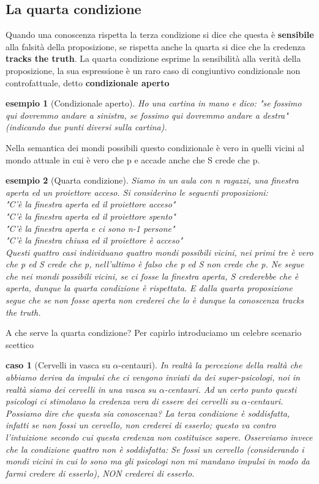 \documentclass[10pt,a4paper]{article}
\newtheorem{esempio}{esempio}
\newtheorem{caso}{caso}
\begin{document}
\subsection{La quarta condizione}
Quando una conoscenza rispetta la terza condizione si dice che questa è \textbf{sensibile} alla falsità della proposizione, se rispetta anche la quarta si dice che la credenza \textbf{tracks the truth}. La quarta condizione esprime la sensibilità alla verità della proposizione, la sua espressione è un raro caso di congiuntivo condizionale non controfattuale, detto \textbf{condizionale aperto}
\begin{esempio}[Condizionale aperto]
	Ho una cartina in mano e dico: "se fossimo qui dovremmo andare a sinistra, se fossimo qui dovremmo andare a destra" (indicando due punti diversi sulla cartina). 
\end{esempio}
Nella semantica dei mondi possibili questo condizionale è vero in quelli vicini al mondo attuale in cui è vero che p e accade anche che S crede che p. 
\begin{esempio}[Quarta condizione]
	Siamo in un aula con n ragazzi, una finestra aperta ed un proiettore acceso. Si considerino le seguenti proposizioni:\\
	"C'è la finestra aperta ed il proiettore acceso"\\
	"C'è la finestra aperta ed il proiettore spento"\\
	"C'è la finestra aperta e ci sono n-1 persone"\\
	"C'è la finestra chiusa ed il proiettore è acceso"\\
	Questi quattro casi individuano quattro mondi possibili vicini, nei primi tre è vero che p ed S crede che p, nell'ultimo è falso che p ed S non crede che p. Ne segue che nei mondi possibili vicini, se ci fosse la finestra aperta, S crederebbe che è aperta, dunque la quarta condizione è rispettata. E dalla quarta proposizione segue che se non fosse aperta non crederei che lo è dunque la conoscenza tracks the truth. 
\end{esempio}
A che serve la quarta condizione? Per capirlo introduciamo un celebre scenario scettico
\begin{caso}[Cervelli in vasca su $\alpha$-centauri]
	In realtà la percezione della realtà che abbiamo deriva da impulsi che ci vengono inviati da dei super-psicologi, noi in realtà siamo dei cervelli in una vasca su $\alpha$-centauri. Ad un certo punto questi psicologi ci stimolano la credenza vera di essere dei cervelli su $\alpha$-centauri. Possiamo dire che questa sia conoscenza? La terza condizione è soddisfatta, infatti se non fossi un cervello, non crederei di esserlo; questo va contro l'intuizione secondo cui questa credenza non costituisce sapere. Osserviamo invece che la condizione quattro non è soddisfatta: Se fossi un cervello (considerando i mondi vicini in cui lo sono ma gli psicologi non mi mandano impulsi in modo da farmi credere di esserlo), NON crederei di esserlo. 
\end{caso}
\end{document}

